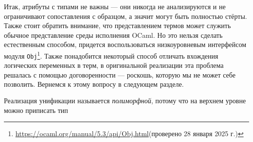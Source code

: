 
Итак, атрибуты с типами не важны --- они никогда не анализируются и не ограничивают сопоставления с образцом, а значит могут быть полностью стёрты.
Также стоит обратить внимание, что представлением термов может служить обычное представление среды исполнения OCaml.
Но это нельзя сделать естественным способом, придется воспользоваться низкоуровневым интерфейсом модуля \lstinline|Obj|\footnote{\url{https://ocaml.org/manual/5.3/api/Obj.html}(проверено 28 января 2025 г.)}.
Также понадобится некоторый способ отличать вхождения логических переменных в терм, в оригинальной реализации эта проблема решалась с помощью договоренности --- роскошь, которую мы не может себе позволить\footnotetext{\textcolor{red}{как-то коряво}}.
Вернемся к этому вопросу в следующем разделе.


Реализация унификации называется \emph{полиморфной}, потому что на верхнем уровне можно приписать тип


